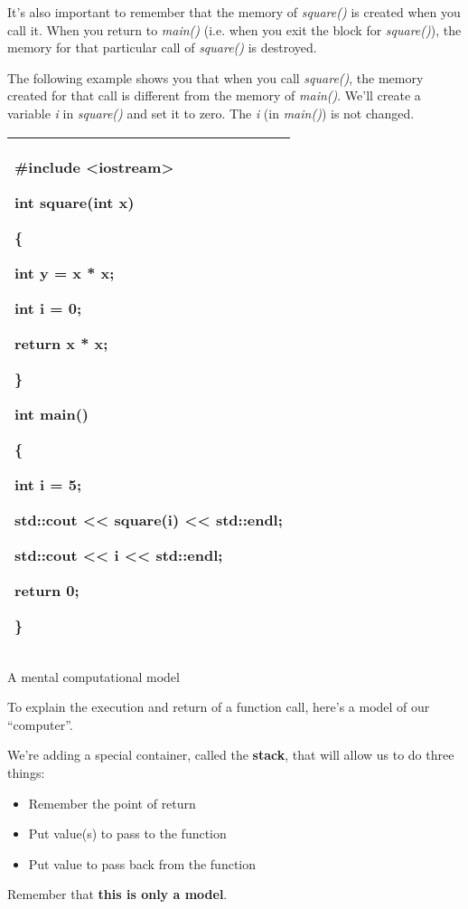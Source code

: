 \documentclass[
]{article}
\providecommand{\tightlist}{%
  \setlength{\itemsep}{0pt}\setlength{\parskip}{0pt}}
\begin{document}
It's also important to remember that the memory of \emph{square()} is
created when you call it. When you return to \emph{main()} (i.e. when
you exit the block for \emph{square()}), the memory for that particular
call of \emph{square()} is destroyed.

The following example shows you that when you call \emph{square()}, the
memory created for that call is different from the memory of
\emph{main()}. We'll create a variable \emph{i} in \emph{square()} and
set it to zero. The \emph{i} (in \emph{main()}) is not changed.

\begin{longtable}[]{@{}l@{}}
\toprule
\endhead
\begin{minipage}[t]{0.97\columnwidth}\raggedright
\#include \textless iostream\textgreater{}

int square(int x)

\{

int y = x * x;

\textbf{int i = 0;}

return x * x;

\}

int main()

\{

int i = 5;

std::cout \textless\textless{} square(i) \textless\textless{} std::endl;

std::cout \textless\textless{} i \textless\textless{} std::endl;

return 0;

\}\strut
\end{minipage}\tabularnewline
\bottomrule
\end{longtable}

A mental computational model

To explain the execution and return of a function call, here's a model
of our ``computer''.

We're adding a special container, called the \textbf{stack}, that will
allow us to do three things:

\begin{itemize}
\tightlist
\item
  Remember the point of return
\item
  Put value(s) to pass to the function
\item
  Put value to pass back from the function
\end{itemize}

Remember that \textbf{this is only a model}.
\end{document}
